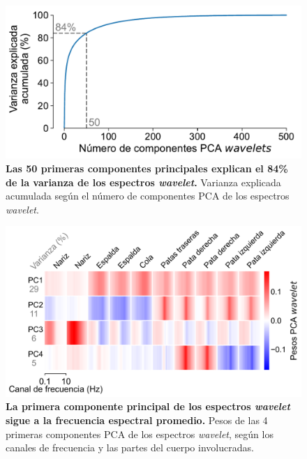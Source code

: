 \begin{appendix}
    \begin{figure}[htbp]
        \centering
        \includegraphics[width=0.7\linewidth]{figuras/capitulo4/varianza_pca.pdf}
        \caption{\textbf{Las 50 primeras componentes principales explican el 84\% de la varianza de los espectros \textit{wavelet}.}
            Varianza explicada acumulada según el número de componentes PCA de los espectros \textit{wavelet}.}
        \label{fig:capitulo4_varianza_pca}
    \end{figure}

    \begin{figure}[htbp]
        \centering
        \includegraphics[width=0.8\linewidth]{figuras/capitulo4/pesos_pca.png}
        \caption{\textbf{La primera componente principal de los espectros \textit{wavelet} sigue a la frecuencia espectral promedio.}
            Pesos de las 4 primeras componentes PCA de los espectros \textit{wavelet}, según los canales de frecuencia y las partes del cuerpo involucradas.}
        \label{fig:capitulo4_pesos_pca}
    \end{figure}


\end{appendix}
